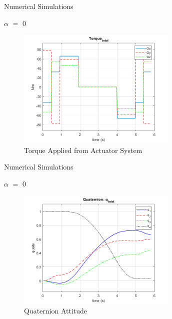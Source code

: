 \documentclass{beamer}
\begin{document}
\begin{frame}{Numerical Simulations}
\begin{block}{$\alpha$ $=$ 0}
	
	\begin{figure}[H]
		\label{fig:torque_total_alpha0}
		\begin{center}
			\includegraphics[width=3in]{figures/alpha0/torque.png}
		\end{center}
		\caption{Torque Applied from Actuator System}
	\end{figure}
	
\end{block}
\end{frame}
\begin{frame}{Numerical Simulations}
	\begin{block}{$\alpha$ $=$ 0}
		
		\begin{figure}[H]
			\label{fig:quats_phi_total_alpha0}
			\begin{center}
				\includegraphics[width=3in]{figures/alpha0/quats.png}
			\end{center}
			\caption{Quaternion Attitude}
		\end{figure}
		
	\end{block}
\end{frame}
\end{document}
